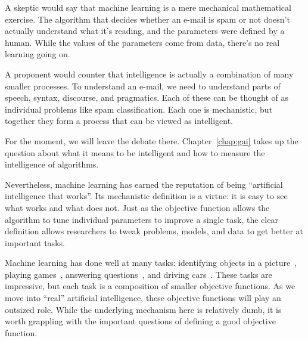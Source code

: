 A skeptic would say that machine learning is a mere mechanical
mathematical exercise.  The algorithm that decides whether an e-mail
is spam or not doesn't actually understand what it's reading, and the
parameters were defined by a human.  While the values of the
parameters come from data, there's no real learning going on.


A proponent would counter that intelligence is actually a combination
of many smaller processes.  To understand an e-mail, we need to
understand parts of speech, syntax, discourse, and pragmatics.  Each
of these can be thought of as individual problems like spam
classification.  Each one is mechanistic, but together they form a
process that can be viewed as intelligent.

For the moment, we will leave the debate there.
Chapter~\ref{chap:gai} takes up the question about what it means to be
intelligent and how to measure the intelligence of algorithms.


Nevertheless, machine learning has earned the reputation of being
``artificial intelligence that works''.  Its mechanistic definition is
a virtue: it is easy to see what works and what does not.  Just as the
objective function allows the algorithm to tune individual parameters
to improve a single task, the clear definition allows researchers to
tweak problems, models, and data to get better at important tasks.


Machine learning has done well at many tasks: identifying objects in
a picture~\citep{russakovsky-15}, playing
games~\citep{vinyals2017starcraft}, answering
questions~\citep{ferruci-10}, and driving cars~\citep{thrun-10}.
%
These tasks are impressive, but each task is a composition of smaller objective
functions.
%
As we move into ``real'' artificial intelligence, these objective
functions will play an outsized role.
%
While the underlying mechanism here is relatively dumb, it is worth
grappling with the important questions of defining a good objective
function.

